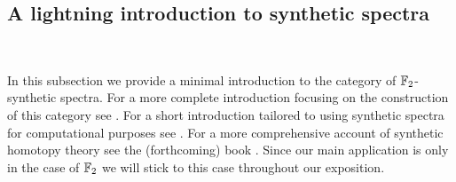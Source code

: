 

\subsection{A lightning introduction to synthetic spectra}\ 
\label{subsec:syn-intro}





In this subsection we provide a minimal introduction to the category of $\operatorname{\mathbb{F}}_2$-synthetic spectra.
For a more complete introduction focusing on the construction of this category see \cite{Pstragowski}.
For a short introduction tailored to using synthetic spectra for computational purposes see \cite[Sections 9 and A]{boundaries}.
For a more comprehensive account of synthetic homotopy theory see the (forthcoming) book \cite{cookware}. Since our main application is only in the case of $\operatorname{\mathbb{F}}_2$ we will stick to this case throughout our exposition.

